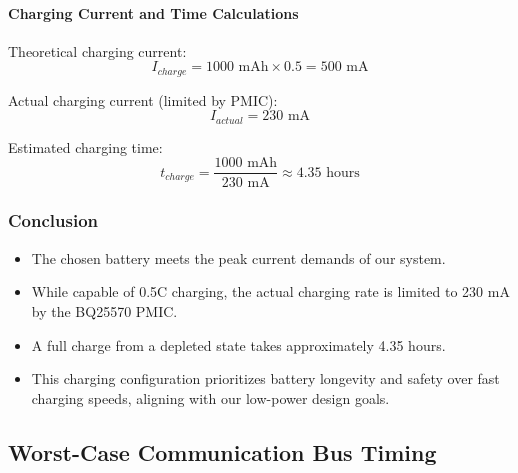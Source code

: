 \documentclass[a4paper,11pt]{article}%
\begin{document}
\paragraph{Charging Current and Time Calculations}

Theoretical charging current:
\begin{equation}
    I_{charge} = 1000 \text{ mAh} \times 0.5 = 500 \text{ mA}
\end{equation}

Actual charging current (limited by PMIC):
\begin{equation}
    I_{actual} = 230 \text{ mA}
\end{equation}

Estimated charging time:
\begin{equation}
    t_{charge} = \frac{1000 \text{ mAh}}{230 \text{ mA}} \approx 4.35 \text{ hours}
\end{equation}

\subsubsection{Conclusion}


\begin{itemize}
    \item The chosen battery meets the peak current demands of our system.
    \item While capable of 0.5C charging, the actual charging rate is limited to 230 mA by the BQ25570 PMIC.
    \item A full charge from a depleted state takes approximately 4.35 hours.
    \item This charging configuration prioritizes battery longevity and safety over fast charging speeds, aligning with our low-power design goals.
\end{itemize}




\subsection{Worst-Case Communication Bus Timing}
\end{document}
